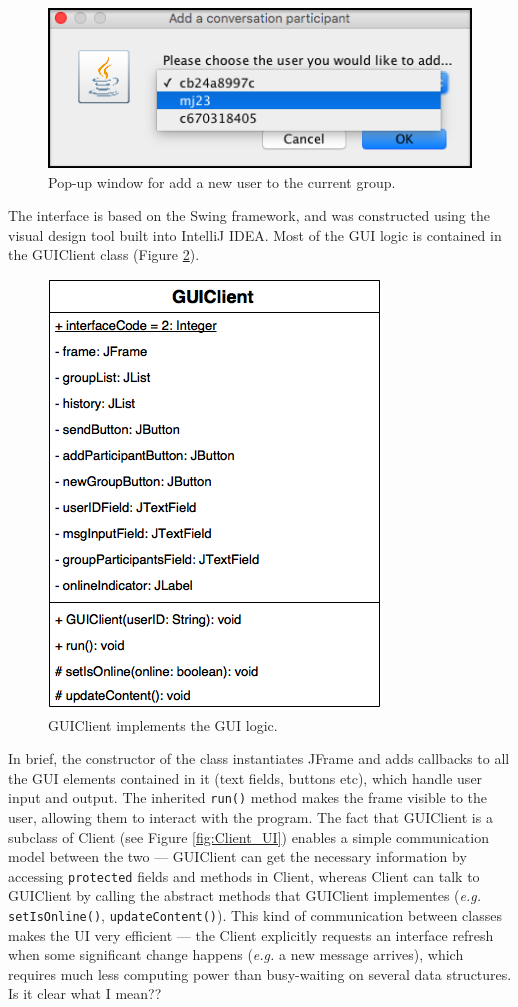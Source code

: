 \documentclass[a4paper, 12pt]{report}
\begin{document}
\begin{figure}[H]
    \captionsetup{width=0.84\textwidth}
    \centering
    \includegraphics[width=0.5\linewidth]{pics/GUI_add.png}
    \caption{\label{fig:GUI_add} Pop-up window for add a new user to the current group.}
\end{figure}

The interface is based on the Swing framework, and was constructed using the visual design tool built into IntelliJ IDEA. Most of the GUI logic is contained in the GUIClient class (Figure \ref{fig:GUIClient}).

\begin{figure}[H]
    \captionsetup{width=0.84\textwidth}
    \centering
    \includegraphics[width=0.45\linewidth]{pics/GUIClient.png}
    \caption{\label{fig:GUIClient} GUIClient implements the GUI logic.}
\end{figure}
In brief, the constructor of the class instantiates JFrame and adds callbacks to all the GUI elements contained in  it (text fields, buttons etc), which handle user input and output. The inherited \texttt{run()} method makes the frame visible to the user, allowing them to interact with the program. The fact that GUIClient is a subclass of Client (see Figure \ref{fig:Client_UI}) enables a simple communication model between the two --- GUIClient can get the necessary information by accessing \texttt{protected} fields and methods in Client, whereas Client can talk to GUIClient by calling the abstract methods that GUIClient implementes (\textit{e.g.} \texttt{setIsOnline()}, \texttt{updateContent()}). This kind of communication between classes makes the UI very efficient --- the Client explicitly requests an interface refresh when some significant change happens (\textit{e.g.} a new message arrives), which requires much less computing power than busy-waiting on several data structures. {\color{red} Is it clear what I mean??}
\end{document}
